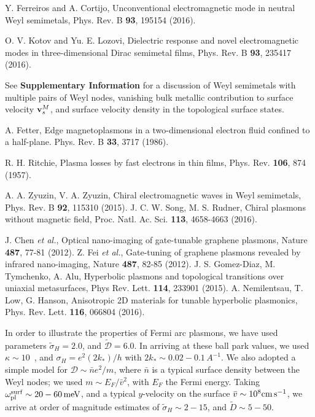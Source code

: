 \documentclass[aps,twocolumn,prl,groupedaddress]{revtex4}
\renewcommand{\vec}[1]{{\bf #1}}
\begin{document}
\begin{thebibliography}{99}
 Y. Ferreiros and A. Cortijo, Unconventional electromagnetic mode in neutral Weyl semimetals, Phys. Rev. B {\bf 93}, 195154 (2016).

 O. V. Kotov and Yu. E. Lozovi, Dielectric response and novel electromagnetic modes in three-dimensional Dirac semimetal films, Phys. Rev. B {\bf 93}, 235417 (2016).

 See {\bf Supplementary Information} for a discussion of Weyl semimetals with multiple pairs of Weyl nodes, vanishing bulk metallic contribution to surface velocity $\vec v_s^M$, and surface velocity density in the topological surface states.

 A. Fetter, Edge magnetoplasmons in a two-dimensional electron fluid confined to a half-plane. Phys. Rev. B {\bf 33}, 3717 (1986). 


 R. H. Ritchie, Plasma losses by fast electrons in thin films, Phys. Rev. {\bf 106}, 874 (1957).


 A. A. Zyuzin, V. A. Zyuzin, Chiral electromagnetic waves in Weyl semimetals, Phys. Rev. B {\bf 92}, 115310 (2015).
 J. C. W. Song, M. S. Rudner, Chiral plasmons without magnetic field, Proc. Natl. Ac. Sci. {\bf 113}, 4658-4663 (2016).


 J. Chen {\it et al.}, Optical nano-imaging of gate-tunable graphene plasmons, Nature {\bf 487}, 77-81 (2012).
 Z. Fei {\it et al.}, Gate-tuning of graphene plasmons revealed by infrared nano-imaging, Nature {\bf 487}, 82-85 (2012).
 J. S. Gomez-Diaz, M. Tymchenko, A. Alu, Hyperbolic plasmons and topological transitions over uniaxial metasurfaces, Phys Rev. Lett. {\bf 114}, 233901 (2015).
 A. Nemilentsau, T. Low, G. Hanson, Anisotropic 2D materials for tunable hyperbolic plasmonics, Phys. Rev. Lett. {\bf 116}, 066804 (2016).

 In order to illustrate the properties of Fermi arc plasmons, we have used parameters $\tilde\sigma_H=2.0$, and $\tilde{\mathcal{D}} =6.0$. 
In arriving at these ball park values, we used $\kappa \sim 10$~\cite{sushkov}, and $\sigma_H = e^2 (2k_*) /h$ with $2k_* \sim 0.02 - 0.1 \, A^{-1}$. We also adopted a simple model for $\mathcal{D} \sim \bar{n}e^2/m$, where $\bar{n}$ is a typical surface density between the Weyl nodes; we used $m \sim E_F/\bar{v}^2$, with $E_F$ the Fermi energy. Taking $\omega_{\rm pl}^{\rm surf} \sim 20-60 \, {\rm meV}$, and a typical $y$-velocity on the surface $\bar{v} \sim 10^8 {\rm cm} \, {\rm s}^{-1}$, we arrive at order of magnitude estimates of $\tilde\sigma_H \sim 2 - 15$, and $\tilde{D} \sim 5 - 50$. 

\end{thebibliography}
\end{document}
